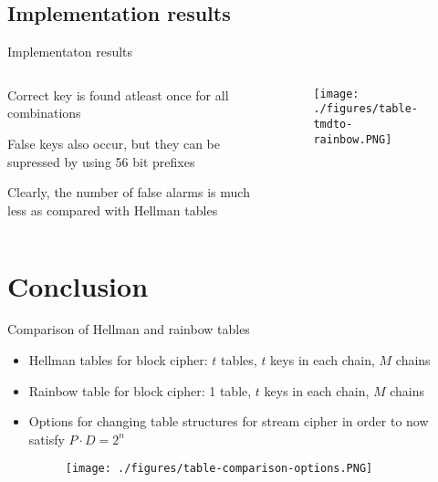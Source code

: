 \documentclass{beamer}
\begin{document}
\subsection*{Implementation results}
\begin{frame}{Implementaton results}
\begin{columns}
\begin{column}{4cm}
\begin{itemize}
\scriptsize{
	\item Correct key is found atleast once for all combinations
	\item False keys also occur, but they can be supressed by using 56 bit prefixes
	\item Clearly, the number of false alarms is much less as compared with Hellman tables
}\end{itemize}
\end{column}
\begin{column}{7cm}
	\begin{figure}[htp]
	\centering
	\texttt{[image: ./figures/table-tmdto-rainbow.PNG]}
	\end{figure}
\end{column}	
\end{columns}
\end{frame}


\section{Conclusion}

\begin{frame}{Comparison of Hellman and rainbow tables}
\footnotesize{
\begin{itemize}
	\item Hellman tables for block cipher: $t$ tables, $t$ keys in each chain, $M$ chains
	\item Rainbow table for block cipher: 1 table, $t$ keys in each chain, $M$ chains
	\item Options for changing table structures for stream cipher in order to now satisfy $P \cdot D = 2^n$
	\begin{figure}[htp]
	\centering
	\texttt{[image: ./figures/table-comparison-options.PNG]}
	\end{figure}
	
\end{itemize}}
\end{frame}
\end{document}

